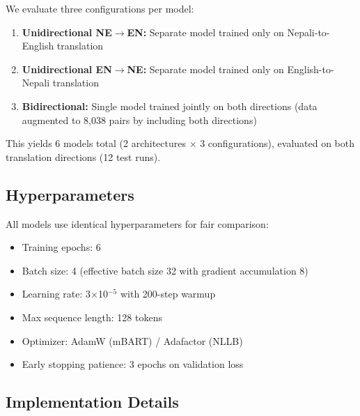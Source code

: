 \documentclass[manuscript, screen, review]{acmart}
\begin{document}
We evaluate three configurations per model:

\begin{enumerate}
\item \textbf{Unidirectional NE$\rightarrow$EN:} Separate model trained only on Nepali-to-English translation

\item \textbf{Unidirectional EN$\rightarrow$NE:} Separate model trained only on English-to-Nepali translation

\item \textbf{Bidirectional:} Single model trained jointly on both directions (data augmented to 8,038 pairs by including both directions)
\end{enumerate}

This yields 6 models total (2 architectures $\times$ 3 configurations), evaluated on both translation directions (12 test runs).


\subsection{Hyperparameters}
\label{subsec:hyperparams}

All models use identical hyperparameters for fair comparison:

\begin{itemize}
\item Training epochs: 6
\item Batch size: 4 (effective batch size 32 with gradient accumulation 8)
\item Learning rate: 3$\times$10$^{-5}$ with 200-step warmup
\item Max sequence length: 128 tokens
\item Optimizer: AdamW (mBART) / Adafactor (NLLB)
\item Early stopping patience: 3 epochs on validation loss
\end{itemize}

\subsection{Implementation Details}
\label{subsec:implementation}
\end{document}
